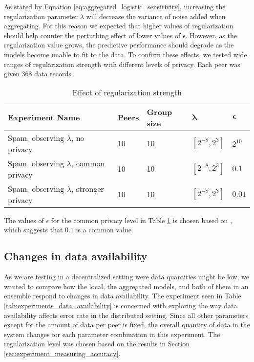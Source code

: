 As stated by Equation \ref{eq:aggregated_logistic_sensitivity},  increasing the regularization parameter $\lambda$ will decrease the variance of noise added when aggregating. For this reason we expected that higher values of regularization should help counter the perturbing effect of lower values of $\epsilon$. However, as the regularization value grows, the predictive performance should degrade as the models become unable to fit to the data. To confirm these effects, we tested wide ranges of regularization strength with different levels of privacy. Each peer was given 368 data records.

\begin{table}[h]
	\centering
	\begin{tabular}{|l|l|l|l|l|}
		\textbf{Experiment Name}    & \textbf{Peers} & \textbf{Group size} & $\boldsymbol{\lambda}$         & $\boldsymbol{\epsilon}$ \\
		\hline
		Spam, observing $\lambda$, no privacy       & 10    & 10  & $[2^{-8}, 2^{3}]$ & $2^{10}$   \\
		Spam, observing $\lambda$, common privacy   & 10    & 10  & $[2^{-8}, 2^{3}]$ & $0.1$      \\
		Spam, observing $\lambda$, stronger privacy & 10    & 10  & $[2^{-8}, 2^{3}]$ & $0.01$    
	\end{tabular}
	\caption{Effect of regularization strength}
	\label{tab:experiments_regularization_strength}
\end{table}

The values of $\epsilon$ for the  common privacy level in Table \ref{tab:experiments_regularization_strength} is chosen based on \cite{dwork2008differential}, which suggests that $0.1$ is a common value.

\subsection{Changes in data availability}

As we are testing in a decentralized setting were data quantities might be low, we wanted to compare how the local, the aggregated models, and both of them in an ensemble respond to changes in data availability.  The experiment seen in Table \ref{tab:experiments_data_availability} is concerned with exploring the way data availability affects error rate in the distributed setting. Since all other parameters except for the amount of data per peer is fixed, the overall quantity of data in the system changes for each parameter combination in this experiment. The regularization level was chosen based on the results in Section \ref{sec:experiment_measuring_accuracy}.

